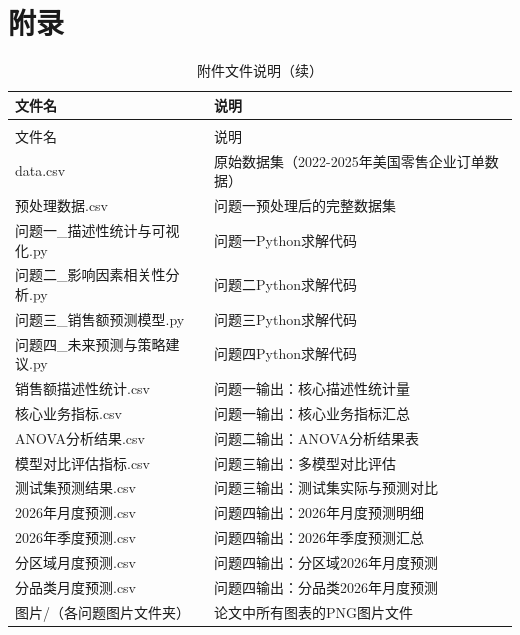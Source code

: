 

\makeatletter
\let\@oldaddcontentsline\addcontentsline
\renewcommand{\addcontentsline}[3]{}
\section*{附录}

\renewcommand{\arraystretch}{1.2}
\begin{longtable}{>{\centering\arraybackslash}p{}>{\centering\arraybackslash}p{}}
  \caption{附件文件说明}
  \label{tab:附录} \\
  \toprule
  文件名 & 说明 \\
  \midrule
  \endfirsthead
  \caption{附件文件说明（续）} \\
  \toprule
  文件名 & 说明 \\
  \midrule
  \endhead
  \bottomrule
  \endfoot
  data.csv & 原始数据集（2022-2025年美国零售企业订单数据） \\
  预处理数据.csv & 问题一预处理后的完整数据集 \\
  问题一\_描述性统计与可视化.py & 问题一Python求解代码 \\
  问题二\_影响因素相关性分析.py & 问题二Python求解代码 \\
  问题三\_销售额预测模型.py & 问题三Python求解代码 \\
  问题四\_未来预测与策略建议.py & 问题四Python求解代码 \\
  销售额描述性统计.csv & 问题一输出：核心描述性统计量 \\
  核心业务指标.csv & 问题一输出：核心业务指标汇总 \\
  ANOVA分析结果.csv & 问题二输出：ANOVA分析结果表 \\
  模型对比评估指标.csv & 问题三输出：多模型对比评估 \\
  测试集预测结果.csv & 问题三输出：测试集实际与预测对比 \\
  2026年月度预测.csv & 问题四输出：2026年月度预测明细 \\
  2026年季度预测.csv & 问题四输出：2026年季度预测汇总 \\
  分区域月度预测.csv & 问题四输出：分区域2026年月度预测 \\
  分品类月度预测.csv & 问题四输出：分品类2026年月度预测 \\
  图片/（各问题图片文件夹） & 论文中所有图表的PNG图片文件 \\
\end{longtable}
\renewcommand{\arraystretch}{1.0}
\endinput
